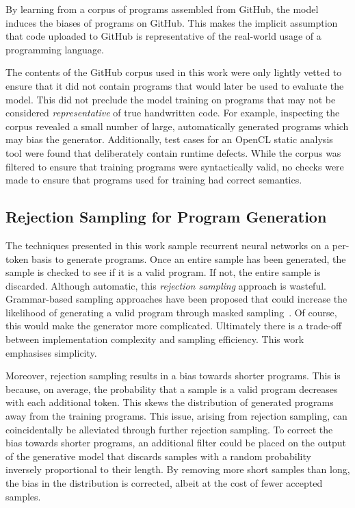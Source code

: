 By learning from a corpus of programs assembled from GitHub, the model induces the biases of programs on GitHub. This makes the implicit assumption that code uploaded to GitHub is representative of the real-world usage of a programming language.

The contents of the GitHub corpus used in this work were only lightly vetted to ensure that it did not contain programs that would later be used to evaluate the model. This did not preclude the model training on programs that may not be considered \emph{representative} of true handwritten code. For example, inspecting the corpus revealed a small number of large, automatically generated programs which may bias the generator. Additionally, test cases for an OpenCL static analysis tool were found that deliberately contain runtime defects. While the corpus was filtered to ensure that training programs were syntactically valid, no checks were made to ensure that programs used for training had correct semantics.


\subsection{Rejection Sampling for Program Generation}

The techniques presented in this work sample recurrent neural networks on a per-token basis to generate programs. Once an entire sample has been generated, the sample is checked to see if it is a valid program. If not, the entire sample is discarded. Although automatic, this \emph{rejection sampling} approach is wasteful. Grammar-based sampling approaches have been proposed that could increase the likelihood of generating a valid program through masked sampling~\cite{Dyer2016}. Of course, this would make the generator more complicated. Ultimately there is a trade-off between implementation complexity and sampling efficiency. This work emphasises simplicity.

Moreover, rejection sampling results in a bias towards shorter programs. This is because, on average, the probability that a sample is a valid program decreases with each additional token. This skews the distribution of generated programs away from the training programs. This issue, arising from rejection sampling, can coincidentally be alleviated through further rejection sampling. To correct the bias towards shorter programs, an additional filter could be placed on the output of the generative model that discards samples with a random probability inversely proportional to their length. By removing more short samples than long, the bias in the distribution is corrected, albeit at the cost of fewer accepted samples.


